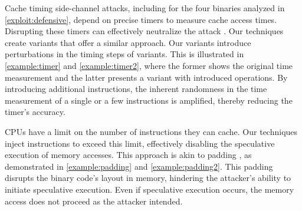 \begin{strategy}
    Cache timing side-channel attacks, including for the four binaries analyzed in \autoref{exploit:defensive}, depend on precise timers to measure cache access times. 
    Disrupting these timers can effectively neutralize the attack \cite{JStimers}. 
    Our techniques create variants that offer a similar approach.
    Our \Wasm variants introduce perturbations in the timing steps of \Wasm variants. 
    This is illustrated in \autoref{example:timer} and \autoref{example:timer2}, where the former shows the original time measurement and the latter presents a variant with introduced operations.
    By introducing additional instructions, the inherent randomness in the time measurement of a single or a few instructions is amplified, thereby reducing the timer's accuracy.

\end{strategy}



\begin{strategy}
    CPUs have a limit on the number of instructions they can cache. 
    Our techniques inject instructions to exceed this limit, effectively disabling the speculative execution of memory accesses. 
    This approach is akin to padding \cite{padding}, as demonstrated in \autoref{example:padding} and \autoref{example:padding2}.
    This padding disrupts the binary code's layout in memory, hindering the attacker's ability to initiate speculative execution. 
    Even if speculative execution occurs, the memory access does not proceed as the attacker intended.
    
\end{strategy}




    


